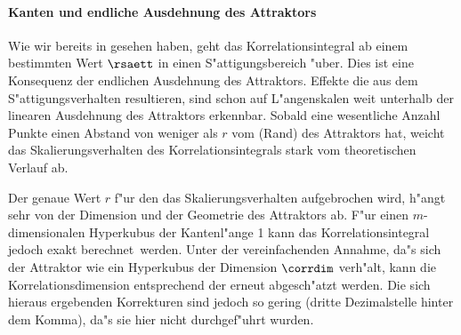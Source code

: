 \paragraph{Kanten und endliche Ausdehnung des Attraktors}
Wie wir bereits in  gesehen haben, geht das Korrelationsintegral ab einem
bestimmten Wert $\rsaett$ in einen S"attigungsbereich "uber. Dies ist eine Konsequenz der
endlichen Ausdehnung des Attraktors. Effekte die aus dem S"attigungsverhalten resultieren, 
sind schon auf L"angen\-skalen weit unterhalb der linearen Ausdehnung des Attraktors
erkennbar. Sobald eine wesentliche Anzahl Punkte einen Abstand von weniger als $r$ vom
\naja(Rand) des Attraktors hat, weicht das Skalierungsverhalten des Korrelationsintegrals
stark vom theoretischen Verlauf ab.

Der genaue Wert $r$ f"ur den das Skalierungsverhalten aufgebrochen wird, h"angt sehr von
der Dimension und der Geometrie des Attraktors ab. 
F"ur einen $m$-dimensionalen Hyperkubus der Kantenl"ange 1 kann das 
Korrelationsintegral jedoch exakt berechnet\footnotemark\  werden.
Unter der vereinfachenden Annahme, da"s sich der Attraktor wie ein Hyperkubus
der Dimension $\corrdim$ verh"alt, kann die Korrelationsdimension entsprechend der
 erneut abgesch"atzt werden. Die sich hieraus ergebenden Korrekturen 
sind jedoch so gering (dritte Dezimalstelle hinter dem Komma), da"s sie hier nicht
durchgef"uhrt wurden.

